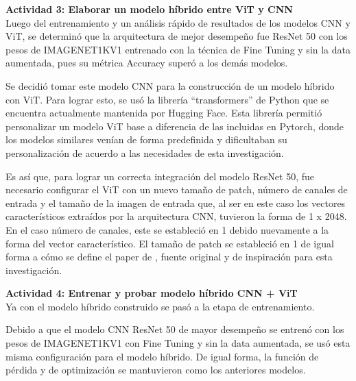 \textbf{Actividad 3:  Elaborar un modelo híbrido entre ViT y CNN}
\\
Luego del entrenamiento y un análisis rápido de resultados de los modelos CNN y ViT, se determinó que la arquitectura de mejor desempeño fue ResNet 50 con los pesos de IMAGENET1KV1 entrenado con la técnica de Fine Tuning y sin la data aumentada, pues su métrica Accuracy superó a los demás modelos.

Se decidió tomar este modelo CNN para la construcción de un modelo híbrido con ViT. Para lograr esto, se usó la librería “transformers” de Python que se encuentra actualmente mantenida por Hugging Face. Esta librería permitió personalizar un modelo ViT base a diferencia de las incluidas en Pytorch, donde los modelos similares venían de forma predefinida y dificultaban su personalización de acuerdo a las necesidades de esta investigación.

Es así que, para lograr un correcta integración del modelo ResNet 50, fue necesario configurar el ViT con un nuevo tamaño de patch, número de canales de entrada y el tamaño de la imagen de entrada que, al ser en este caso los vectores característicos extraídos por la arquitectura CNN, tuvieron la forma de 1 x 2048. En el caso número de canales, este se estableció en 1 debido nuevamente a la forma del vector característico. El tamaño de patch se estableció en 1 de igual forma a cómo se define el paper de \cite{pr_JERBI2023autoclassViTGAN}, fuente original y de inspiración para esta investigación.

\textbf{Actividad 4: Entrenar y probar modelo híbrido CNN + ViT}
\\
Ya con el modelo híbrido construido se pasó a la etapa de entrenamiento.

Debido a que el modelo CNN ResNet 50 de mayor desempeño se entrenó con los pesos de IMAGENET1KV1 con Fine Tuning y sin la data aumentada, se usó esta misma configuración para el modelo híbrido. De igual forma, la función de pérdida y de optimización se mantuvieron como los anteriores modelos.

